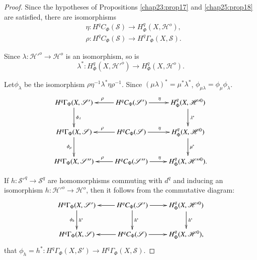 \begin{proof}%
Since the hypotheses of Propositions \ref{chap23:prop17} and
\ref{chap25:prop18}  are satisfied, there are isomorphisms 
\begin{align*}
& \eta : H^q C_\Phi (\mathscr{S}) \rightarrow H^q_\Phi
  (X,\mathscr{H}^o),\\ 
& \rho : H^q C_\Phi (\mathscr{S}) \rightarrow H^q \Gamma_\Phi
  (X,\mathscr{S}). 
\end{align*}

Since $\lambda : \mathscr{H}'^o \rightarrow \mathscr{H}^o$ is an
isomorphism, so is  
$$
\lambda^* : H^q_\Phi (X,\mathscr{H}'^o) \rightarrow H^q_\Phi
(X,\mathscr{H}^o). 
$$
 
Let\pageoriginale $\phi_\lambda$ be the isomorphism $\rho \eta^{-1}
\lambda^*  \eta\rho^{-1}$. Since $(\mu\lambda)^* = \mu^* \lambda^*$, 
$\phi_{\mu\lambda} = \phi_\mu  \phi_\lambda$. 
\[
\xymatrix{
H^q \Gamma_{\Phi} (X,\mathscr{S}') \ar[d]^{\phi_{\lambda}} &
H^qC_{\Phi}(\mathscr{S}') \ar[r]^{\eta} \ar[l]_{\rho} & H^q_{\Phi}
(X,\mathscr{H}'^0)\ar[d]^{\lambda^{\ast}} \\
H^q \Gamma_{\Phi} (X,\mathscr{S}) \ar[d]_{\phi_{\mu}} & H^qC_{\Phi}
(\mathscr{S}) \ar[r]^{\eta} \ar[l]_{\rho} & H^q_{\Phi}
(X,\mathscr{H}^0)\ar[d]^{\mu^{\ast}} \\
H^q \Gamma_{\Phi} (X,\mathscr{S}'') & H^qC_{\Phi}(\mathscr{S}'')
\ar[r]^{\eta} \ar[l]_{\rho} & H^q_{\Phi} (X,\mathscr{H}''^0).
 }
\]

If $h : \mathscr{S}'^q \rightarrow \mathscr{S}^q$ are homomorphisms
commuting with $d^q$ and inducing an isomorphism $h : \mathscr{H}'^o
\rightarrow \mathscr{H}^o$, then it follows from the commutative
diagram: 
\[
\xymatrix{
H^q\Gamma_{\Phi} (X,\mathscr{S}') \ar[d]_{\phi_h}^{h^{\ast}} & H^q
C_{\Phi} (\mathscr{S}') \ar[r]\ar[d]^{h^{\ast}} \ar[l] & H^q_{\Phi}
(X,\mathscr{H}'^0) \ar[d]^{h^{\ast}}\\
H^q \Gamma_{\Phi} (X,\mathscr{S}) & H^qC_{\Phi} (\mathscr{S})
\ar[r]\ar[l] & H^q_{\Phi} (X,\mathscr{H}^0),
 }
\]
that $\phi_h = h^* : H^q \Gamma_\Phi (X,\mathscr{S}') \rightarrow H^q
\Gamma_\Phi (X,\mathscr{S})$. 
\end{proof}


